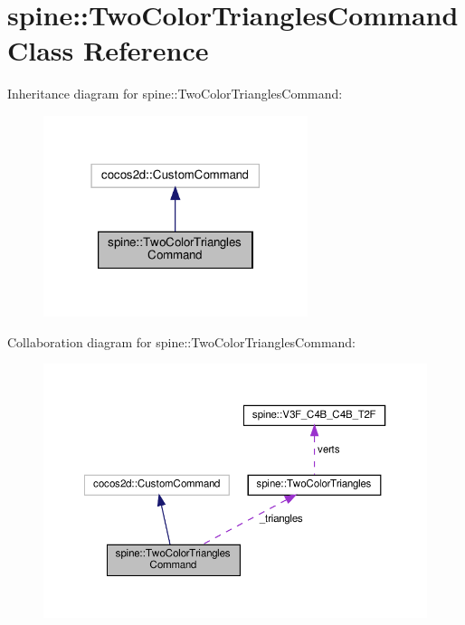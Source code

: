 \hypertarget{classspine_1_1TwoColorTrianglesCommand}{}\section{spine\+:\+:Two\+Color\+Triangles\+Command Class Reference}
\label{classspine_1_1TwoColorTrianglesCommand}


Inheritance diagram for spine\+:\+:Two\+Color\+Triangles\+Command\+:
\nopagebreak
\begin{figure}[H]
\begin{center}
\leavevmode
\includegraphics[width=219pt]{classspine_1_1TwoColorTrianglesCommand__inherit__graph}
\end{center}
\end{figure}


Collaboration diagram for spine\+:\+:Two\+Color\+Triangles\+Command\+:
\nopagebreak
\begin{figure}[H]
\begin{center}
\leavevmode
\includegraphics[width=350pt]{classspine_1_1TwoColorTrianglesCommand__coll__graph}
\end{center}
\end{figure}
